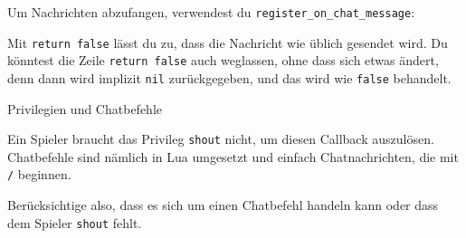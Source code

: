 Um Nachrichten abzufangen, verwendest du
\texttt{register\_\allowbreak{}on\_\allowbreak{}chat\_\allowbreak{}message}:

\begin{Shaded}
\begin{Highlighting}[]
\OperatorTok{(}\OperatorTok{(}\OperatorTok{,} \OperatorTok{)}
    \OperatorTok{(}    \OperatorTok{)}
     
\OperatorTok{)}
\end{Highlighting}
\end{Shaded}

Mit \texttt{return false} lässt du zu, dass die Nachricht wie üblich
gesendet wird. Du könntest die Zeile \texttt{return false} auch
weglassen, ohne dass sich etwas ändert, denn dann wird implizit
\texttt{nil} zurückgegeben, und das wird wie \texttt{false} behandelt.

\begin{hinweis}{Privilegien und Chatbefehle}

Ein Spieler braucht das Privileg \texttt{shout} nicht, um diesen
Callback auszulösen. Chatbefehle sind nämlich
in Lua umgesetzt und einfach Chatnachrichten, die mit
\texttt{/\allowbreak{}} beginnen.

\end{hinweis}

Berücksichtige also, dass es sich um einen Chatbefehl handeln kann oder
dass dem Spieler \texttt{shout} fehlt.

